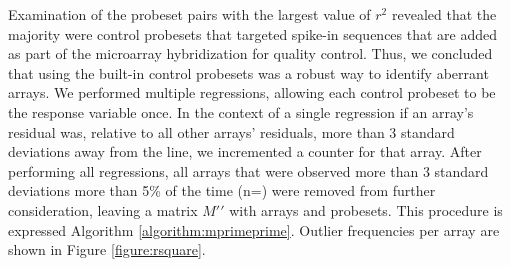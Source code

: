 \documentclass{bioinfo}
\begin{document}
\begin{methods}
Examination of the probeset pairs with the largest value of $r^2$ revealed that
the majority were control probesets that targeted spike-in sequences that are
added as part of the microarray hybridization for quality control.  Thus, we
concluded that using the built-in control probesets was a robust way to
identify aberrant arrays.  We performed 
multiple regressions, allowing each control probeset to be the response
variable once.  In the context of a single regression if an array's residual
was, relative to all other arrays' residuals, more than 3 standard deviations
away from the line, we incremented a counter for that array.  After performing
all  regressions, all arrays that were observed
more than 3 standard deviations more than 5\% of the time
(n=) were removed from further consideration,
leaving a matrix $M\prime\prime$ with  arrays and 
probesets.  This procedure is expressed Algorithm \ref{algorithm:mprimeprime}.
Outlier frequencies per array are shown in Figure \ref{figure:rsquare}.



\end{methods}
\end{document}
